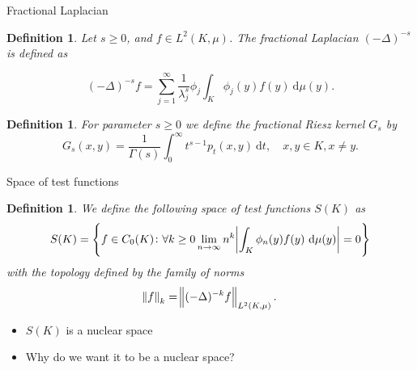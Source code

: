 \documentclass{beamer}
\newtheorem{defi}[theorems]{Definition}
\newcommand{\dd}{\ \text{d}}
\begin{document}
	\begin{frame}{Fractional Laplacian}
		
		\vspace{3em}
		\setcounter{theorems}{30}
		\begin{defi}\label{fracLaplacian}
			Let $s \geq 0$, and $f \in L^2(K, \mu)$. The \emph{fractional Laplacian} $(-\Delta)^{-s}$ is defined as
			
			\vspace{-0.5em}
			\begin{equation}
				(-\Delta)^{-s}f = \sum_{j = 1}^{\infty} \frac{1}{\lambda_{j}^{s}} \phi_j \int_{K} \phi_j(y)f(y) \dd \mu(y).
			\end{equation}
		\end{defi}
		\pause
		\setcounter{theorems}{33}
		\begin{defi}\label{fractionalRieszKernel}
			For parameter $s \geq 0$ we define the \emph{fractional Riesz kernel} $G_s$ by
			\begin{equation}
				G_{s}(x,y) = \frac{1}{\Gamma(s)}\int_{0}^{\infty} t^{s-1}p_t(x,y) \dd t, \quad x, y \in K, x \neq y.
			\end{equation}
		\end{defi}
	\end{frame}
	
	\begin{frame}{Space of test functions}
		\vspace{1.5em}
		\setcounter{theorems}{37}
		\begin{defi}
			We define the following space of test functions $S(K)$ as
			\begin{equation}
				S(K) = \cbr{f \in C_0(K) \colon \forall k \geq 0 \lim_{n \to \infty} n ^{k} \abs{\int_{K} \phi_n(y)f(y) \dd \mu (y)} = 0}
			\end{equation}
			with the topology defined by the family of norms
			\begin{equation}
				\norm{f}_k = \norm{(-\Delta)^{-k}f}_{L^2(K, \mu)}.
			\end{equation}
		\end{defi}
		
		\pause
		\begin{itemize}
			\item<2-> $S(K)$ is a nuclear space
			\item<3-> Why do we want it to be a nuclear space?
		\end{itemize}
	\end{frame}
	
\end{document}
